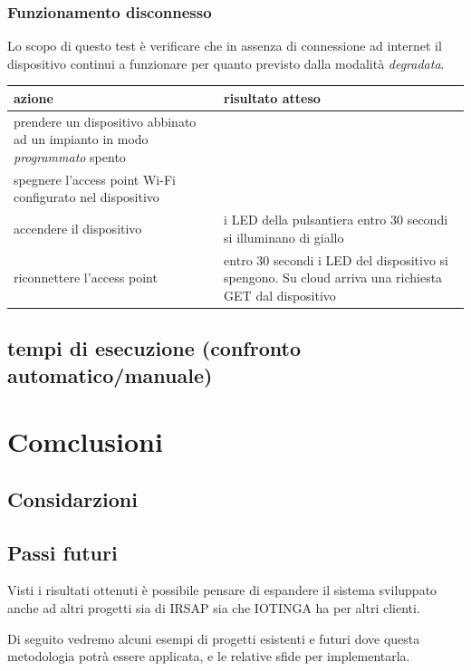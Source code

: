 \documentclass[a4paper,titlepage]{article}
\begin{document}
\subsubsection{Funzionamento disconnesso}

Lo scopo di questo test è verificare che in assenza di connessione ad internet il
dispositivo continui a funzionare per quanto previsto dalla modalità \textit{degradata}.

\begin{center}
\begin{tabular}{| p{5cm} | p{5cm} |}
    \hline \textbf{azione} & \textbf{risultato atteso} \\
    \hline prendere un dispositivo abbinato ad un impianto in modo \textit{programmato} spento & \\
    \hline spegnere l'access point Wi-Fi configurato nel dispositivo & \\
    \hline accendere il dispositivo & i LED della pulsantiera entro 30 secondi si illuminano di giallo \\
    \hline riconnettere l'access point & entro 30 secondi i LED del dispositivo si spengono. Su cloud arriva una richiesta GET dal dispositivo \\
    \hline
\end{tabular}
\end{center}

\subsection{tempi di esecuzione (confronto automatico/manuale)}

\section{Comclusioni}

\subsection{Considarzioni}

\subsection{Passi futuri}

Visti i risultati ottenuti è possibile pensare di espandere il sistema sviluppato
anche ad altri progetti sia di IRSAP sia che IOTINGA ha per altri clienti.

Di seguito vedremo alcuni esempi di progetti esistenti e futuri dove questa metodologia
potrà essere applicata, e le relative sfide per implementarla.
\end{document}
